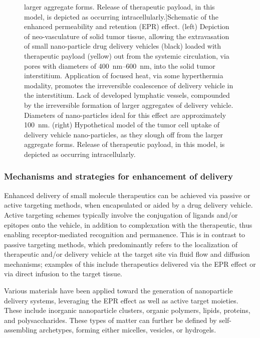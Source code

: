 \begin{refsection}
\begin{figure}[h!]
larger aggregate forms. Release of therapeutic payload, in this model, is
depicted as occurring intracellularly.]{Schematic of the enhanced permeability and retention (EPR) effect. (left)
Depiction of neo-vasculature of solid tumor tissue, allowing the extravasation
of small nano-particle drug delivery vehicles (black) loaded with therapeutic
payload (yellow) out from the systemic circulation, via pores with 
diameters of \SIrange{400}{600}{\nm},\cite{Yuan1995} into the solid tumor
interstitium. Application of focused heat, via some hyperthermia modality,
promotes the irreversible coalescence of delivery vehicle in the interstitium.
Lack of developed lymphatic vessels, compounded by the irreversible formation of
larger aggregates of delivery vehicle. Diameters of nano-particles ideal for
this effect are approximately \SI{100}{\nm}.\cite{Charrois2003} (right) Hypothetical model of the tumor
cell uptake of delivery vehicle nano-particles, as they slough off from the
larger aggregate forms. Release of therapeutic payload, in this model, is
depicted as occurring intracellularly.}\label{fig:EPR_effect} \end{figure}

\subsubsection{Mechanisms and strategies for enhancement of delivery}
Enhanced delivery of small molecule therapeutics can be achieved via passive or
active targeting methods, when encapsulated or aided by a drug delivery vehicle.
Active targeting schemes typically involve the conjugation of ligands and/or
epitopes onto the vehicle, in addition to complexation with the therapeutic,
thus enabling receptor-mediated recognition and permanence.\cite{Singh2009} This
is in contrast to passive targeting methods, which predominantly refers to the
localization of therapeutic and/or delivery vehicle at the target site
via fluid flow and diffusion mechanisms; examples of this include therapeutics
delivered via the EPR effect or via direct infusion to the target
tissue.\cite{Singh2009}

Various materials have been applied toward the generation of nanoparticle
delivery systems, leveraging the EPR effect as well as active target moieties.
These include inorganic nanoparticle clusters,\cite{Thomas2003} organic
polymers,\cite{Yallapu2010b} lipids,\cite{Ranson1996}
proteins,\cite{Mackay2008} and polysaccharides.\cite{Stenekes2000} These types
of matter can further be defined by self-assembling archetypes, forming either
micelles, vesicles, or hydrogels.\cite{Branco2009}


\end{refsection}
